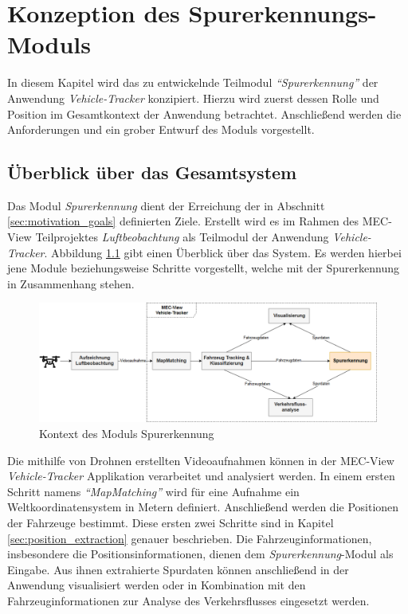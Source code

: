 
\chapter{Konzeption des Spurerkennungs-Moduls}
\label{cha:konzeption}

In diesem Kapitel wird das zu entwickelnde Teilmodul \textit{``Spurerkennung''}
der Anwendung \textit{Vehicle-Tracker} konzipiert. Hierzu wird zuerst dessen Rolle und Position im Gesamtkontext
der Anwendung betrachtet. Anschließend werden die Anforderungen und ein grober Entwurf des Moduls vorgestellt.

\section{Überblick über das Gesamtsystem}

Das Modul \textit{Spurerkennung} dient der Erreichung der in Abschnitt
\ref{sec:motivation_goals} definierten Ziele. Erstellt wird es im Rahmen des MEC-View Teilprojektes
\textit{Luftbeobachtung} als Teilmodul der Anwendung \textit{Vehicle-Tracker}.
Abbildung \ref{fig:concept_laneDetection_context} gibt einen Überblick über das System.
Es werden hierbei jene Module beziehungsweise Schritte vorgestellt, welche mit der Spurerkennung in
Zusammenhang stehen.

\begin{figure}[H]
    \centering
    \includegraphics[width=\linewidth]{resources/img/konzeption/Context_LaneDetection}
    \caption{Kontext des Moduls Spurerkennung}
    \label{fig:concept_laneDetection_context}
\end{figure}

Die mithilfe von Drohnen erstellten Videoaufnahmen können in der MEC-View \textit{Vehicle-Tracker} Applikation
verarbeitet und analysiert werden. In einem ersten Schritt namens \textit{``MapMatching''} wird für eine Aufnahme
ein Weltkoordinatensystem in Metern definiert. Anschließend werden die Positionen
der Fahrzeuge bestimmt. Diese ersten zwei Schritte sind in Kapitel \ref{sec:position_extraction} genauer beschrieben.
Die Fahrzeuginformationen, insbesondere die Positionsinformationen, dienen dem \textit{Spurerkennung}-Modul
als Eingabe. Aus ihnen extrahierte Spurdaten können anschließend in der Anwendung visualisiert werden oder in Kombination
mit den Fahrzeuginformationen zur Analyse des Verkehrsflusses eingesetzt werden.


